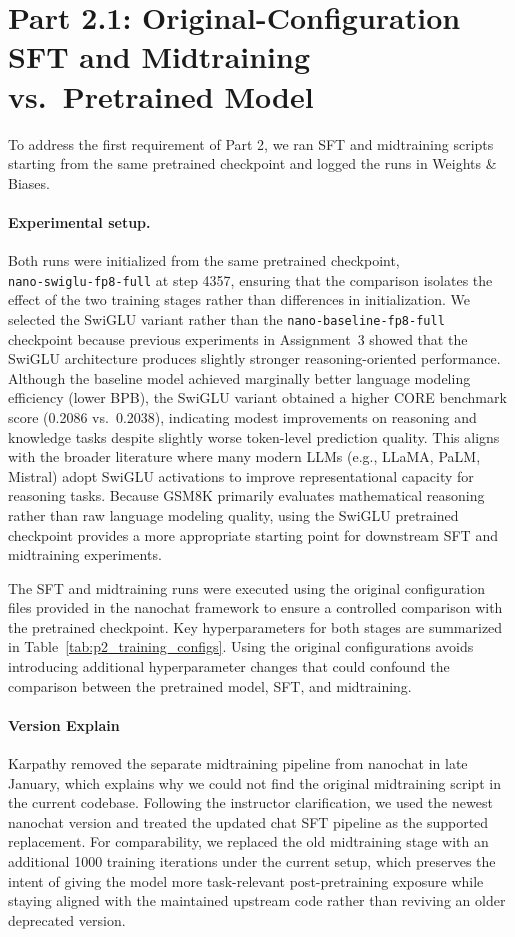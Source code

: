 \section{Part 2.1: Original-Configuration SFT and Midtraining vs.\ Pretrained Model}

To address the first requirement of Part 2, we ran SFT and midtraining scripts starting from the same pretrained checkpoint and logged the runs in Weights \& Biases. 

\paragraph{Experimental setup.}
Both runs were initialized from the same pretrained checkpoint, \\
\texttt{nano-swiglu-fp8-full} at step 4357, ensuring that the comparison isolates the effect of the two training stages rather than differences in initialization. 
We selected the SwiGLU variant rather than the \texttt{nano-baseline-fp8-full} checkpoint because previous experiments in Assignment~3 showed that the SwiGLU architecture produces slightly stronger reasoning-oriented performance. 
Although the baseline model achieved marginally better language modeling efficiency (lower BPB), the SwiGLU variant obtained a higher CORE benchmark score (0.2086 vs.\ 0.2038), indicating modest improvements on reasoning and knowledge tasks despite slightly worse token-level prediction quality. 
This aligns with the broader literature where many modern LLMs (e.g., LLaMA, PaLM, Mistral) adopt SwiGLU activations to improve representational capacity for reasoning tasks. 
Because GSM8K primarily evaluates mathematical reasoning rather than raw language modeling quality, using the SwiGLU pretrained checkpoint provides a more appropriate starting point for downstream SFT and midtraining experiments.

The SFT and midtraining runs were executed using the original configuration files provided in the nanochat framework to ensure a controlled comparison with the pretrained checkpoint. 
Key hyperparameters for both stages are summarized in Table~\ref{tab:p2_training_configs}. 
Using the original configurations avoids introducing additional hyperparameter changes that could confound the comparison between the pretrained model, SFT, and midtraining.

\paragraph{Version Explain}
Karpathy removed the separate midtraining pipeline from nanochat in late January, which explains why we could not find the original midtraining script in the current codebase. Following the instructor clarification, we used the newest nanochat version and treated the updated chat SFT pipeline as the supported replacement. For comparability, we replaced the old midtraining stage with an additional 1000 training iterations under the current setup, which preserves the intent of giving the model more task-relevant post-pretraining exposure while staying aligned with the maintained upstream code rather than reviving an older deprecated version.

